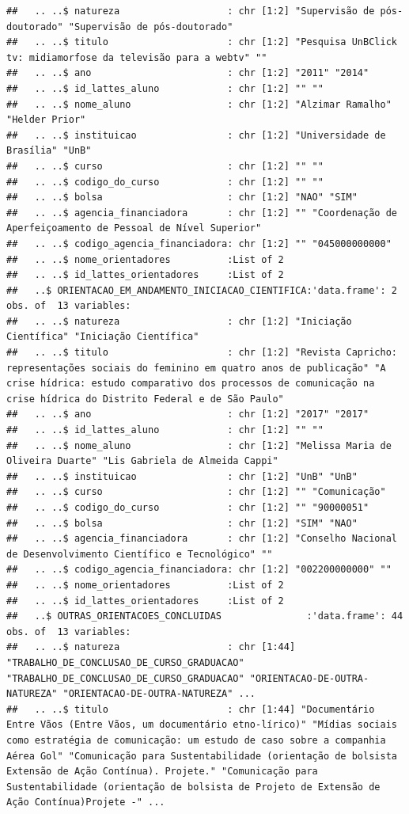 \documentclass[]{article}
\begin{document}
\begin{verbatim}
##   .. ..$ natureza                   : chr [1:2] "Supervisão de pós-doutorado" "Supervisão de pós-doutorado"
##   .. ..$ titulo                     : chr [1:2] "Pesquisa UnBClick tv: midiamorfose da televisão para a webtv" ""
##   .. ..$ ano                        : chr [1:2] "2011" "2014"
##   .. ..$ id_lattes_aluno            : chr [1:2] "" ""
##   .. ..$ nome_aluno                 : chr [1:2] "Alzimar Ramalho" "Helder Prior"
##   .. ..$ instituicao                : chr [1:2] "Universidade de Brasília" "UnB"
##   .. ..$ curso                      : chr [1:2] "" ""
##   .. ..$ codigo_do_curso            : chr [1:2] "" ""
##   .. ..$ bolsa                      : chr [1:2] "NAO" "SIM"
##   .. ..$ agencia_financiadora       : chr [1:2] "" "Coordenação de Aperfeiçoamento de Pessoal de Nível Superior"
##   .. ..$ codigo_agencia_financiadora: chr [1:2] "" "045000000000"
##   .. ..$ nome_orientadores          :List of 2
##   .. ..$ id_lattes_orientadores     :List of 2
##   ..$ ORIENTACAO_EM_ANDAMENTO_INICIACAO_CIENTIFICA:'data.frame': 2 obs. of  13 variables:
##   .. ..$ natureza                   : chr [1:2] "Iniciação Científica" "Iniciação Científica"
##   .. ..$ titulo                     : chr [1:2] "Revista Capricho: representações sociais do feminino em quatro anos de publicação" "A crise hídrica: estudo comparativo dos processos de comunicação na crise hídrica do Distrito Federal e de São Paulo"
##   .. ..$ ano                        : chr [1:2] "2017" "2017"
##   .. ..$ id_lattes_aluno            : chr [1:2] "" ""
##   .. ..$ nome_aluno                 : chr [1:2] "Melissa Maria de Oliveira Duarte" "Lis Gabriela de Almeida Cappi"
##   .. ..$ instituicao                : chr [1:2] "UnB" "UnB"
##   .. ..$ curso                      : chr [1:2] "" "Comunicação"
##   .. ..$ codigo_do_curso            : chr [1:2] "" "90000051"
##   .. ..$ bolsa                      : chr [1:2] "SIM" "NAO"
##   .. ..$ agencia_financiadora       : chr [1:2] "Conselho Nacional de Desenvolvimento Científico e Tecnológico" ""
##   .. ..$ codigo_agencia_financiadora: chr [1:2] "002200000000" ""
##   .. ..$ nome_orientadores          :List of 2
##   .. ..$ id_lattes_orientadores     :List of 2
##   ..$ OUTRAS_ORIENTACOES_CONCLUIDAS               :'data.frame': 44 obs. of  13 variables:
##   .. ..$ natureza                   : chr [1:44] "TRABALHO_DE_CONCLUSAO_DE_CURSO_GRADUACAO" "TRABALHO_DE_CONCLUSAO_DE_CURSO_GRADUACAO" "ORIENTACAO-DE-OUTRA-NATUREZA" "ORIENTACAO-DE-OUTRA-NATUREZA" ...
##   .. ..$ titulo                     : chr [1:44] "Documentário Entre Vãos (Entre Vãos, um documentário etno-lírico)" "Mídias sociais como estratégia de comunicação: um estudo de caso sobre a companhia Aérea Gol" "Comunicação para Sustentabilidade (orientação de bolsista Extensão de Ação Contínua). Projete." "Comunicação para Sustentabilidade (orientação de bolsista de Projeto de Extensão de Ação Contínua)Projete -" ...

\end{verbatim}
\end{document}
